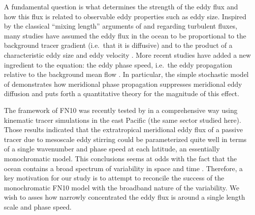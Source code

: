 \documentclass[10pt]{article}
\begin{document}
A fundamental question is what determines the strength of the eddy flux and how this flux is related to observable eddy properties such as eddy size.
Inspired by the classical ``mixing length'' arguments of \citet{Taylor1915} and \citet{Prandtl1925} regarding turbulent fluxes, many studies have assumed the eddy flux in the ocean to be proportional to the background tracer gradient (i.e.~that it is diffusive) and to the product of a characteristic eddy size and eddy velocity \citep[e.g.][]{Holloway1986,KefferHolloway1988,VisbeckEtAl1997,Stammer1998}. More recent studies have added a new ingredient to the equation: the eddy phase speed, i.e.~the eddy propagation relative to the background mean flow \citep{MarshallEtAl2006,SmithMarshall2009,AbernatheyEtAl2010,FerrariNikurashin2010,KlockerEtAl2012a,KlockerEtAl2012b,AbernatheyMarshall2013}. In particular, the simple stochastic model of \citet[][henceforth FN10]{FerrariNikurashin2010} demonstrates how meridional phase propagation suppresses meridional eddy diffusion and puts forth a quantitative theory for the magnitude of this effect.

The framework of FN10 was recently tested by \citet[][henceforth KA15]{KlockerAbernathey2014} in a comprehensive way using kinematic tracer simulations in the east Pacific (the same sector studied here). Those results indicated that the extratropical meridional eddy flux of a passive tracer due to mesoscale eddy stirring could be parameterized quite well in terms of a single wavenumber and phase speed at each latitude, an essentially monochromatic model. This conclusions seems at odds with the fact that the ocean contains a broad spectrum of variability in space and time \citep{Others,WorthamWunsch2013}. Therefore, a key motivation for our study is to attempt to reconcile the success of the monochromatic FN10 model with the broadband nature of the variability. We wish to asses how narrowly concentrated the eddy flux is around a single length scale and phase speed.
\end{document}
